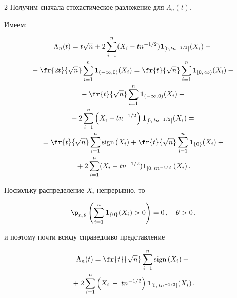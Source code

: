 \begin{multicols}{2}
Получим сначала стохастическое разложение для $\Lambda_n(t)$.


Имеем:


\begin{multline*}


\Lambda_n(t)=t\sqrt n+2\sum\limits_{i=1}^{n}


(X_i - tn^{-1/2})\I_{[0,tn^{-1/2}]}(X_i)-{}\\


{}-\fr{2t}{\sqrt n}


\sum\limits_{i=1}^n \I_{(-\infty,0)}(X_i)=


\fr{t}{\sqrt n}\sum \limits_{i=1}^{n} \I_{[0,\,\infty)}(X_i)-{}\\


{}- 


\fr{t}{\sqrt n}\sum \limits_{i=1}^n \I_{(-\infty, 0)}(X_i)+{}\\


{}+


2\sum \limits_{i=1}^n \left (X_i-tn^{-1/2}\right )\I_{[0,\,tn^{-1/2}]}(X_i)={}\\


{}=\fr{t}{\sqrt n}\sum \limits_{i=1}^n \mathrm{sign}\left (X_i\right )+


\fr{t}{\sqrt n}\sum \limits_{i=1}^n \I_{\{0\}}(X_i)+{}\\


{}+


2\sum \limits_{i=1}^n (X_i-tn^{-1/2})\I_{[0,\,tn^{-1/2}]}(X_i)\,.


\end{multline*}


Поскольку распределение $X_i$ непрерывно, то


$$


\p_{n,\theta}\left (\sum \limits_{i=1}^n {\I_{\{0\}}}


(X_i)>0\right )=0\,, \quad  \theta>0\,,


$$


и поэтому почти всюду справедливо представление


\begin{multline*}


\Lambda_n(t)=\fr{t}{\sqrt n}


\sum \limits_{i=1}^n \mathrm{sign}\left(X_i\right )+{}\\


{}+


2\sum\limits_{i=1}^n\left ( X_i\:-\: tn^{-1/2}\right )


\I_{[0,\,tn^{-1/2}]}(X_i)\,.



\end{multline*}
\end{multicols}
